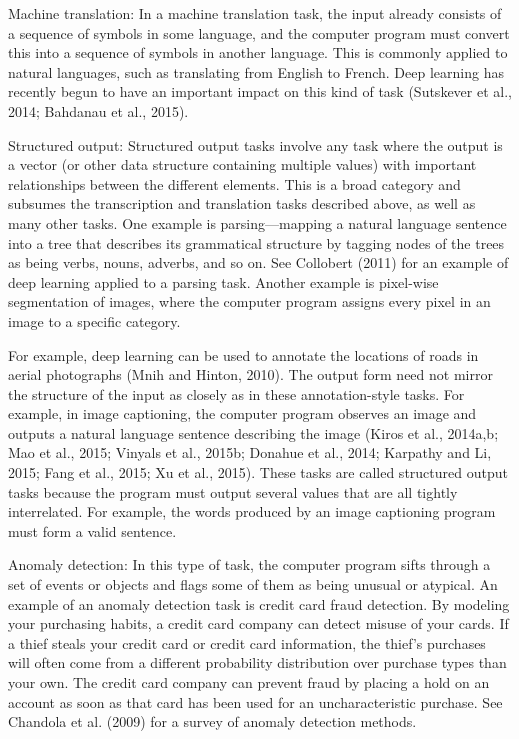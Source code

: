 \documentclass[11pt]{article}
\begin{document}
Machine translation: In a machine translation task, the input already consists of a sequence of symbols in some language, and the computer program must convert this into a sequence of symbols in another language.
This is commonly applied to natural languages, such as translating from English to French.
Deep learning has recently begun to have an important impact on this kind of task (Sutskever et al., 2014; Bahdanau et al., 2015).

Structured output: Structured output tasks involve any task where the output is a vector (or other data structure containing multiple values) with important relationships between the different elements.
This is a broad category and subsumes the transcription and translation tasks described above, as well as many other tasks.
One example is parsing—mapping a natural language sentence into a tree that describes its grammatical structure by tagging nodes of the trees as being verbs, nouns, adverbs, and so on.
See Collobert (2011) for an example of deep learning applied to a parsing task.
Another example is pixel-wise segmentation of images, where the computer program assigns every pixel in an image to a specific category.

For example, deep learning can be used to annotate the locations of roads in aerial photographs (Mnih and Hinton, 2010).
The output form need not mirror the structure of the input as closely as in these annotation-style tasks.
For example, in image captioning, the computer program observes an image and outputs a natural language sentence describing the image (Kiros et al., 2014a,b; Mao et al., 2015; Vinyals et al., 2015b; Donahue et al., 2014; Karpathy and Li, 2015; Fang et al., 2015; Xu et al., 2015).
These tasks are called structured output tasks because the program must output several values that are all tightly interrelated.
For example, the words produced by an image captioning program must form a valid sentence.

Anomaly detection: In this type of task, the computer program sifts through a set of events or objects and flags some of them as being unusual or atypical.
An example of an anomaly detection task is credit card fraud detection.
By modeling your purchasing habits, a credit card company can detect misuse of your cards.
If a thief steals your credit card or credit card information, the thief’s purchases will often come from a different probability distribution over purchase types than your own.
The credit card company can prevent fraud by placing a hold on an account as soon as that card has been used for an uncharacteristic purchase.
See Chandola et al. (2009) for a survey of anomaly detection methods.
\end{document}
